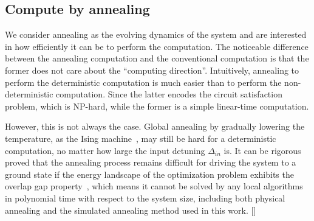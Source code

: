 \documentclass[twocolumn,superscriptaddress,english,showpacs,longbibliography]{revtex4-2}
\newcommand{\ym}[1]{[{\color{red}{YM: #1}}]}
\begin{document}
\subsection{Compute by annealing}\label{simulated-annealing-algorithm}

We consider annealing as the evolving dynamics of the system and are interested in how efficiently it can be to perform the computation.
The noticeable difference between the annealing computation and the conventional computation is that the former does not care about the ``computing direction''.
Intuitively, annealing to perform the deterministic computation is much easier than to perform the non-deterministic computation.
Since the latter encodes the circuit satisfaction problem, which is NP-hard, while the former is a simple linear-time computation.

However, this is not always the case.
Global annealing by gradually lowering the temperature, as the Ising machine~\cite{fabre2014optical}, may still be hard for a deterministic computation, no matter how large the input detuning $\Delta_{in}$ is.
It can be rigorous proved that the annealing process remains difficult for driving the system to a ground state if the energy landscape of the optimization problem exhibits the overlap gap property~\cite{Gamarnik2021}, 
which means it cannot be solved by any local algorithms in polynomial time with respect to the system size, including both physical annealing and the simulated annealing method used in this work.
\ym{Any reference for the previous hypothesis ``...cannot be solve...''}
\end{document}
